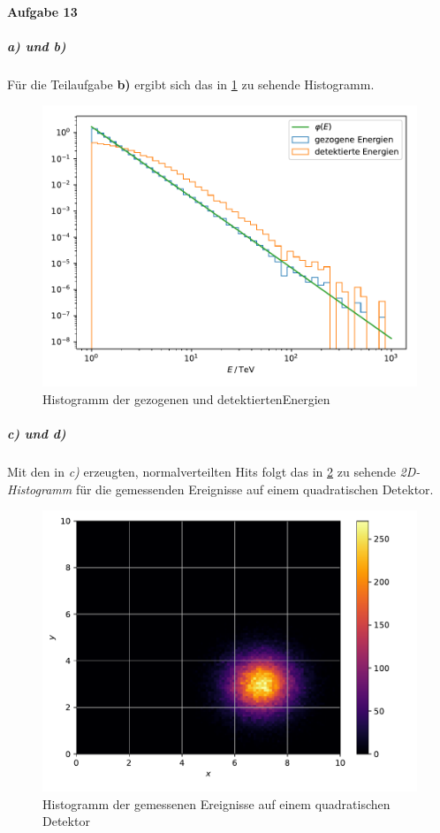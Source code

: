 \paragraph{Aufgabe 13}


\subparagraph{a) und b)}
Für die Teilaufgabe \textbf{b)} ergibt sich das in \ref{fig:13ab} zu sehende Histogramm.
\begin{figure}[H]
  \includegraphics{Aufgabe13/b.pdf}
  \caption{Histogramm der gezogenen und detektiertenEnergien }
  \label{fig:13ab}
\end{figure}

\subparagraph{c) und d)}
 Mit den in \textit{c)} erzeugten, normalverteilten Hits folgt das in \ref{fig:13cd} zu sehende \textit{2D-Histogramm} für die gemessenden Ereignisse auf einem quadratischen Detektor.
 \begin{figure}[H]
   \includegraphics{Aufgabe13/d.pdf}
   \caption{Histogramm der gemessenen Ereignisse auf einem quadratischen Detektor }
   \label{fig:13cd}
 \end{figure}

